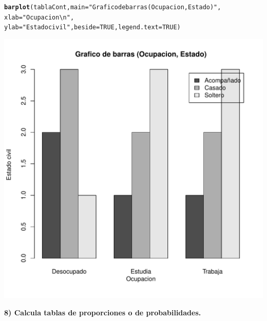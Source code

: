 \documentclass[12pt,letterpaper]{article}\usepackage[]{graphicx}\usepackage[]{color}
\makeatletter
\def\maxwidth{ %
  \ifdim\Gin@nat@width>\linewidth
    \linewidth
  \else
    \Gin@nat@width
  \fi
}
\newcommand{\hlnum}[1]{\textcolor[rgb]{0.686,0.059,0.569}{#1}}%
\newcommand{\hlstr}[1]{\textcolor[rgb]{0.192,0.494,0.8}{#1}}%
\newcommand{\hlstd}[1]{\textcolor[rgb]{0.345,0.345,0.345}{#1}}%
\newcommand{\hlkwc}[1]{\textcolor[rgb]{0.333,0.667,0.333}{#1}}%
\newcommand{\hlkwd}[1]{\textcolor[rgb]{0.737,0.353,0.396}{\textbf{#1}}}%
\newenvironment{kframe}{%
 \def\at@end@of@kframe{}%
 \ifinner\ifhmode%
  \def\at@end@of@kframe{\end{minipage}}%
  \begin{minipage}{\columnwidth}%
 \fi\fi%
 \def\FrameCommand##1{\hskip\@totalleftmargin \hskip-\fboxsep
 \colorbox{shadecolor}{##1}\hskip-\fboxsep
     \hskip-\linewidth \hskip-\@totalleftmargin \hskip\columnwidth}%
 \MakeFramed {\advance\hsize-\width
   \@totalleftmargin\z@ \linewidth\hsize
   \@setminipage}}%
 {\par\unskip\endMakeFramed%
 \at@end@of@kframe}
\newenvironment{knitrout}{}{} %
\makeatother
\begin{document}
\begin{knitrout}
\begin{kframe}
\begin{alltt}
\hlkwd{barplot}\hlstd{(tablaCont,} \hlkwc{main}\hlstd{=}\hlstr{"Grafico de barras (Ocupacion, Estado)"}\hlstd{,}
        \hlkwc{xlab}\hlstd{=}\hlstr{"Ocupacion\textbackslash{}n"}\hlstd{,}
\hlkwc{ylab}\hlstd{=}\hlstr{"Estado civil"}\hlstd{,} \hlkwc{beside}\hlstd{=}\hlnum{TRUE}\hlstd{,} \hlkwc{legend.text}\hlstd{=}\hlnum{TRUE}\hlstd{)}
\end{alltt}
\end{kframe}
\includegraphics[width=\maxwidth]{figure/unnamed-chunk-6-3} 

\end{knitrout}
\textbf{8) Calcula tablas de proporciones o de probabilidades.} 
\end{document}
